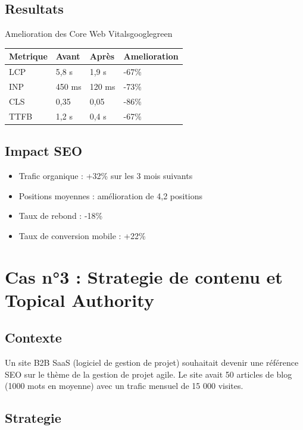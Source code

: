 \subsection{Resultats}

\begin{mybox}{Amelioration des Core Web Vitals}{googlegreen}
\begin{tabular}{llll}
    \toprule
    \textbf{Metrique} & \textbf{Avant} & \textbf{Après} & \textbf{Amelioration} \\
    \midrule
    LCP                & 5,8 s          & 1,9 s          & -67\% \\
    INP                & 450 ms         & 120 ms         & -73\% \\
    CLS                & 0,35           & 0,05           & -86\% \\
    TTFB               & 1,2 s          & 0,4 s          & -67\% \\
    \bottomrule
\end{tabular}
\end{mybox}

\subsection{Impact SEO}
\begin{itemize}
    \item Trafic organique : +32\% sur les 3 mois suivants
    \item Positions moyennes : amélioration de 4,2 positions
    \item Taux de rebond : -18\%
    \item Taux de conversion mobile : +22\%
\end{itemize}

\section{Cas n°3 : Strategie de contenu et Topical Authority}

\subsection{Contexte}
Un site B2B SaaS (logiciel de gestion de projet) souhaitait devenir une référence SEO sur le thème de la gestion de projet agile. Le site avait 50 articles de blog (1000 mots en moyenne) avec un trafic mensuel de 15 000 visites.

\subsection{Strategie}

